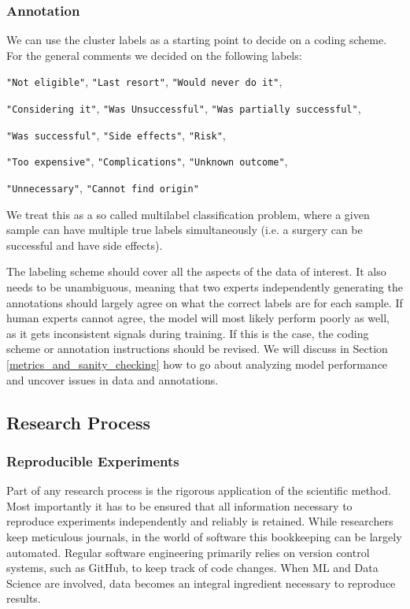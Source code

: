 \subsubsection{Annotation}
We can use the cluster labels as a starting point to decide on a coding scheme. For the general comments we decided on the following labels:
\begin{displayquote}
    \texttt{"Not eligible"},
    \texttt{"Last resort"},
    \texttt{"Would never do it"},

    \texttt{"Considering it"},
    \texttt{"Was Unsuccessful"},
    \texttt{"Was partially successful"},

    \texttt{"Was successful"},
    \texttt{"Side effects"},
    \texttt{"Risk"},

    \texttt{"Too expensive"},
    \texttt{"Complications"},
    \texttt{"Unknown outcome"},

    \texttt{"Unnecessary"},
    \texttt{"Cannot find origin"}
\end{displayquote}
We treat this as a so called multilabel classification problem, where a given sample can have multiple true labels simultaneously (i.e. a surgery can be successful and have side effects).

The labeling scheme should cover all the aspects of the data of interest.
It also needs to be unambiguous, meaning that two experts independently generating the annotations should largely agree on what the correct labels are for each sample.
If human experts cannot agree, the model will most likely perform poorly as well, as it gets inconsistent signals during training.
If this is the case, the coding scheme or annotation instructions should be revised.
We will discuss in Section \ref{metrics_and_sanity_checking} how to go about analyzing model performance and uncover issues in data and annotations.

\subsection{Research Process}
\subsubsection{Reproducible Experiments}
Part of any research process is the rigorous application of the scientific method.
Most importantly it has to be ensured that all information necessary to reproduce experiments independently and reliably is retained.
While researchers keep meticulous journals, in the world of software this bookkeeping can be largely automated.
Regular software engineering primarily relies on version control systems, such as GitHub, to keep track of code changes.
When ML and Data Science are involved, data becomes an integral ingredient necessary to reproduce results.

